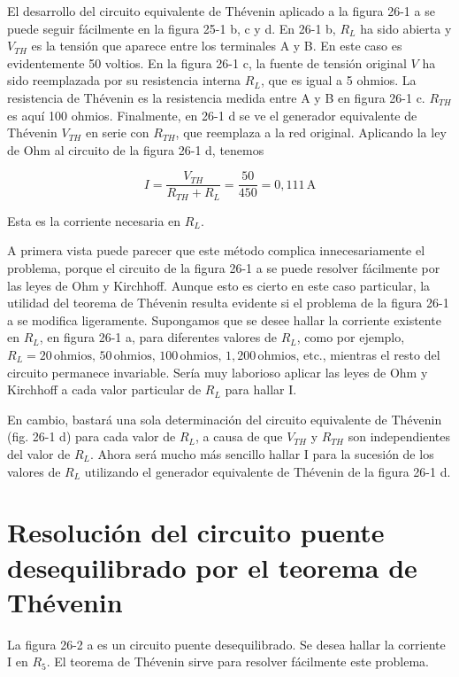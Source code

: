 \documentclass{article}
\begin{document}
El desarrollo del circuito equivalente de Thévenin aplicado a la figura 26-1 a se puede seguir fácilmente en la figura 25-1 b, c y d. En 26-1 b, \( R_L \) ha sido abierta y \( V_{TH} \) es la tensión que aparece entre los terminales A y B. En este caso es evidentemente 50 voltios. En la figura 26-1 c, la fuente de tensión original \( V \) ha sido reemplazada por su resistencia interna \( R_L \), que es igual a 5 ohmios. La resistencia de Thévenin es la resistencia medida entre A y B en figura 26-1 c. \( R_{TH} \) es aquí 100 ohmios. Finalmente, en 26-1 d se ve el generador equivalente de Thévenin \( V_{TH} \) en serie con \( R_{TH} \), que reemplaza a la red original. Aplicando la ley de Ohm al circuito de la figura 26-1 d, tenemos

\[
I = \frac{V_{TH}}{R_{TH} + R_L} = \frac{50}{450} = 0,111 \, \text{A}
\]

Esta es la corriente necesaria en \( R_L \).

A primera vista puede parecer que este método complica innecesariamente el problema, porque el circuito de la figura 26-1 a se puede resolver fácilmente por las leyes de Ohm y Kirchhoff. Aunque esto es cierto en este caso particular, la utilidad del teorema de Thévenin resulta evidente si el problema de la figura 26-1 a se modifica ligeramente. Supongamos que se desee hallar la corriente existente en \( R_L \), en figura 26-1 a, para diferentes valores de \( R_L \), como por ejemplo, \( R_L = 20 \, \text{ohmios}, \, 50 \, \text{ohmios}, \, 100 \, \text{ohmios}, \, 1,200 \, \text{ohmios}, \, \text{etc.} \), mientras el resto del circuito permanece invariable. Sería muy laborioso aplicar las leyes de Ohm y Kirchhoff a cada valor particular de \( R_L \) para hallar I.

En cambio, bastará una sola determinación del circuito equivalente de Thévenin (fig. 26-1 d) para cada valor de \( R_L \), a causa de que \( V_{TH} \) y \( R_{TH} \) son independientes del valor de \( R_L \). Ahora será mucho más sencillo hallar I para la sucesión de los valores de \( R_L \) utilizando el generador equivalente de Thévenin de la figura 26-1 d.

\section*{Resolución del circuito puente desequilibrado por el teorema de Thévenin}
La figura 26-2 a es un circuito puente desequilibrado. Se desea hallar la corriente I en \( R_5 \). El teorema de Thévenin sirve para resolver fácilmente este problema.
\end{document}

